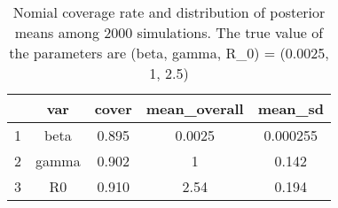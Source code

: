 \begin{table}[ht]
\centering
\begin{tabular}{ccccc}
  \toprule
 & var & cover & mean\_overall & mean\_sd \\ 
  \midrule
1 & beta & 0.895 & 0.0025 & 0.000255 \\ 
  2 & gamma & 0.902 &    1 & 0.142 \\ 
  3 & R0 & 0.910 & 2.54 & 0.194 \\ 
   \bottomrule
\end{tabular}
\caption{Nomial coverage rate and distribution of posterior means among 2000 simulations. The true value of the parameters are (beta, gamma, R_0) = (0.0025, 1, 2.5)} 
\label{tab:cov}
\end{table}
